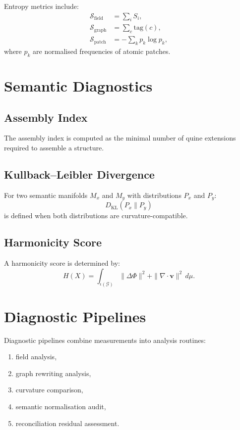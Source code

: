 Entropy metrics include:
\begin{align*}
\mathcal{S}_{\mathrm{field}} &= \sum_i S_i, \\
\mathcal{S}_{\mathrm{graph}} &= \sum_{c} \mathrm{tag}(c), \\
\mathcal{S}_{\mathrm{patch}} &= -\sum_k p_k \log p_k,
\end{align*}
where $p_k$ are normalised frequencies of atomic patches.

\section{Semantic Diagnostics}

\subsection{Assembly Index}

The assembly index is computed as the minimal number of quine extensions required to assemble a structure.

\subsection{Kullback–Leibler Divergence}

For two semantic manifolds $M_x$ and $M_y$ with distributions $P_x$ and $P_y$:
\[
D_{\mathrm{KL}}(P_x \| P_y)
\]
is defined when both distributions are curvature-compatible.

\subsection{Harmonicity Score}

A harmonicity score is determined by:
\[
H(X) = \int_{\iota(\mathcal{G})} \|\Delta \Phi\|^2 + \|\nabla \cdot \mathbf{v}\|^2 \, d\mu.
\]

\section{Diagnostic Pipelines}

Diagnostic pipelines combine measurements into analysis routines:
\begin{enumerate}
\item field analysis,
\item graph rewriting analysis,
\item curvature comparison,
\item semantic normalisation audit,
\item reconciliation residual assessment.
\end{enumerate}

